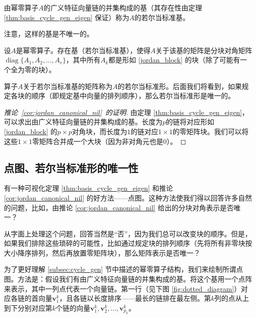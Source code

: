 \begin{definition*}
    由幂零算子$A$的广义特征向量链的并集构成的基（其存在性由定理 \ref{thm:basis_cycle_gen_eigen} 保证）称为$A$的若尔当标准基。
\end{definition*}

注意，这样的基是不唯一的。

\begin{corollary}\label{cor:jordan_canonical_nil}
    设$A$是幂零算子。存在基（若尔当标准基），使得$A$关于该基的矩阵是分块对角矩阵$\operatorname{diag}\{A_1,A_2,\dots,A_r\}$，其中所有$A_k$都是形如 \eqref{jordan_block} 的块（除了可能有一个全为零的块）。
\end{corollary}

算子$A$关于若尔当标准基的矩阵称为$A$的若尔当标准形。后面我们将看到，如果规定各块的顺序（即规定基中向量的排列顺序），那么若尔当标准形是唯一的。

\begin{proof}[推论~\ref{cor:jordan_canonical_nil}~的证明]
    由定理 \ref{thm:basis_cycle_gen_eigen}，可以求出由广义特征向量链的并集构成的基。长度为$p$的链将对应形如 \eqref{jordan_block} 的$p\times p$对角块，而长度为$1$的链对应$1\times 1$的零矩阵块。我们可以将这些$1\times 1$零矩阵合并成一个大块（因为非对角元也是$0$）。
\end{proof}

\subsection{点图、若尔当标准形的唯一性}

有一种可视化定理 \ref{thm:basis_cycle_gen_eigen} 和推论 \ref{cor:jordan_canonical_nil} 的好方法——点图。这种方法使我们得以回答许多自然的问题，比如，由推论 \ref{cor:jordan_canonical_nil} 给出的分块对角表示是否唯一？

从字面上处理这个问题，回答当然是“否”，因为我们总可以改变块的顺序。但是，如果我们排除这些琐碎的可能性，比如通过规定块的排列顺序（先将所有非零块按大小降序排列，然后再放置零矩阵块），那么矩阵表示是否唯一？

为了更好理解 \ref{subsec:cycle_gen} 节中描述的幂零算子结构，我们来绘制所谓点图。方法是：假设我们有由广义特征向量链的并集构成的基。将这个基用一个点阵来表示，其中一列点代表一个向量链。第一行（见下图 \ref{fig:dotted_diagram}）对应各链的首向量$\mathbf{v}_1^k$，且各链以长度排序——最长的链排在最左侧。第$k$列的点从上到下分别对应第$k$个链的向量$\mathbf{v}_1^k,\mathbf{v}_2^k,\dots,\mathbf{v}_{p_k}^k$。

